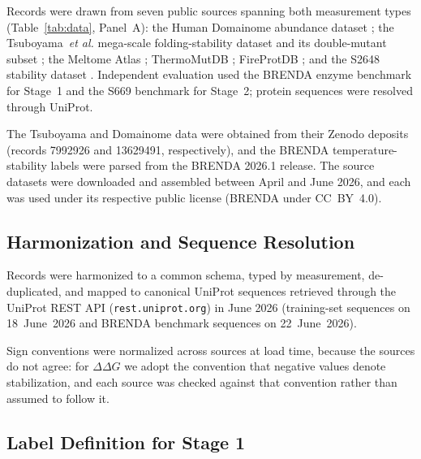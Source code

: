 \documentclass[journal,article,submit,moreauthors]{Definitions/mdpi}
\newcommand{\ddg}{\ensuremath{\Delta\Delta G}}
\begin{document}
Records were drawn from seven public sources spanning both measurement types
(Table~\ref{tab:data}, Panel~A): the Human Domainome abundance dataset
\citep{beltran2025domainome}; the Tsuboyama~\textit{et al.} mega-scale folding-stability
dataset and its double-mutant subset \citep{tsuboyama2023}; the Meltome Atlas
\citep{jarzab2020meltome}; ThermoMutDB \citep{xavier2021thermomutdb}; FireProtDB
\citep{stourac2021fireprotdb}; and the S2648 stability dataset \citep{dehouck2009s2648}.
Independent evaluation used the BRENDA enzyme benchmark \citep{chang2021brenda} for
Stage~1 and the S669 benchmark \citep{pancotti2022s669} for Stage~2; protein sequences
were resolved through UniProt.

The Tsuboyama and Domainome data were obtained from their Zenodo deposits (records 7992926
and 13629491, respectively), and the BRENDA temperature-stability labels were parsed from
the BRENDA 2026.1 release. The source datasets were downloaded and assembled between April
and June 2026, and each was used under its respective public license (BRENDA under
CC~BY~4.0).

\subsection{Harmonization and Sequence Resolution}

Records were harmonized to a common schema, typed by measurement, de-duplicated, and
mapped to canonical UniProt sequences retrieved through the UniProt REST API
(\texttt{rest.uniprot.org}) in June 2026 (training-set sequences on 18~June~2026 and
BRENDA benchmark sequences on 22~June~2026).

Sign conventions were normalized across sources at load time, because the sources do not
agree: for \ddg{} we adopt the convention that negative values denote stabilization, and
each source was checked against that convention rather than assumed to follow it.

\subsection{Label Definition for Stage 1}
\label{sec:stage1-labels}
\end{document}
